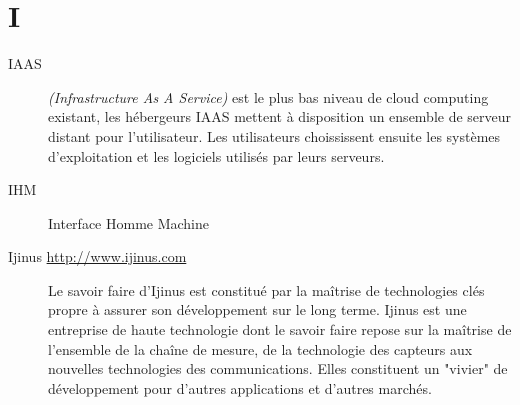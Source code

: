 \section{I}

\begin{description}

\item[IAAS] \textit{(Infrastructure As A Service)} est le plus bas niveau de cloud
 computing existant, les hébergeurs IAAS mettent à disposition un ensemble de serveur
 distant pour l'utilisateur. Les utilisateurs choississent ensuite les systèmes d'exploitation
 et les logiciels utilisés par leurs serveurs. 

\item[IHM] Interface Homme Machine

\item[Ijinus \url{http://www.ijinus.com}]
        Le savoir faire d’Ijinus est constitué par la maîtrise de technologies clés propre à assurer son développement sur le long terme.
Ijinus est une entreprise de haute technologie dont le savoir faire repose sur la maîtrise de l’ensemble de la chaîne de mesure, de la technologie des capteurs aux nouvelles technologies des communications.
Elles constituent un "vivier" de développement pour d'autres applications et d'autres marchés.
\end{description}
